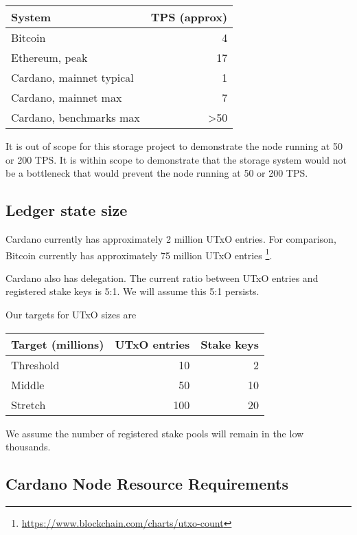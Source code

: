 \documentclass[11pt,a4paper]{article}
\begin{document}
\begin{center}
\begin{tabular}[]{lr}
  System    & TPS (approx) \\
  \toprule
  Bitcoin                  & 4   \\
  Ethereum, peak           & 17  \\
  Cardano, mainnet typical & 1   \\
  Cardano, mainnet max     & 7   \\
  Cardano, benchmarks max  & \textgreater 50   \\
\end{tabular}
\end{center}

It is out of scope for this storage project to demonstrate the node running at
50 or 200 TPS. It is within scope to demonstrate that the storage system would
not be a bottleneck that would prevent the node running at 50 or 200 TPS.

\subsection{Ledger state size}

Cardano currently has approximately 2 million UTxO entries. For comparison,
Bitcoin currently has approximately 75 million UTxO entries%
\footnote{\url{https://www.blockchain.com/charts/utxo-count}}.

Cardano also has delegation. The current ratio between UTxO entries
and registered stake keys is 5:1. We will assume this 5:1 persists.

Our targets for UTxO sizes are

\begin{center}
\begin{tabular}[]{lrr}
  Target (millions) & UTxO entries & Stake keys \\
  \toprule
  Threshold &  10  &  2 \\
  Middle    &  50  & 10 \\
  Stretch   & 100  & 20
\end{tabular}
\end{center}

We assume the number of registered stake pools will remain in the low thousands.

\subsection{Cardano Node Resource Requirements}
\end{document}
